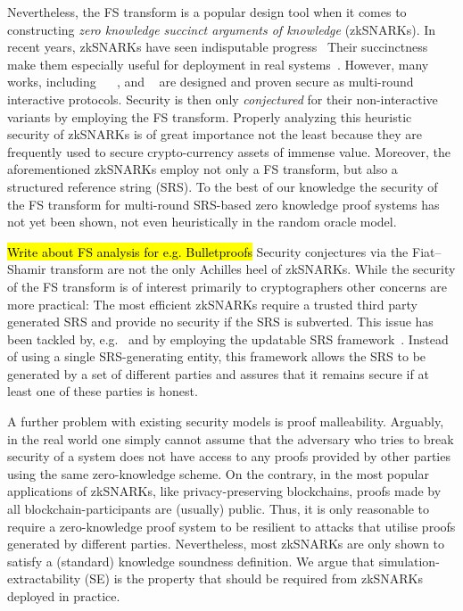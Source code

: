 \documentclass[runningheads,11pt]{llncs}
\begin{document}
Nevertheless, the FS transform is a popular design tool when it comes
to constructing \emph{zero knowledge succinct arguments of knowledge}
(zkSNARKs). In recent years, zkSNARKs have seen indisputable progress~\cite{AC:Groth10a,TCC:Lipmaa12,EC:GGPR13,SP:PHGR13,AC:Lipmaa13,AC:DFGK14,EC:Groth16,SP:BBBPWM18}
Their succinctness make them especially useful for deployment in
real systems~\cite{REPO:Zcash20,ARXIV:RonZaj19,REPO:Zeth20,REPO:Celo20,REPO:Aztec20}. However,
many works, including \sonic{}~\cite{CCS:MBKM19}
\plonk{}~\cite{EPRINT:GabWilCio19}, and \marlin~\cite{EC:CHMMVW20} are designed and proven secure as multi-round interactive protocols. Security is then only
\emph{conjectured} for their non-interactive variants by employing
the FS transform. Properly analyzing this heuristic security of zkSNARKs is of great importance not the least because they are frequently
used to secure crypto-currency assets of immense value. Moreover, the aforementioned
zkSNARKs employ not only a FS transform, but also a structured
reference string (SRS). To the best of our knowledge the security of the FS
transform for multi-round SRS-based zero knowledge proof systems has not yet been
shown, not even heuristically in the random oracle model. 

\hl{Write about FS analysis for e.g. Bulletproofs}
Security conjectures via the Fiat--Shamir transform are not the only Achilles heel of zkSNARKs. While the security of the FS transform is of interest primarily to cryptographers other concerns are more practical: The most efficient zkSNARKs
require a trusted third party generated SRS and provide no security if the
SRS is subverted. This issue has been tackled by, e.g.~\plonk{}
and \sonic{} by employing the updatable SRS framework~\cite{C:GKMMM18}. Instead of
using a single SRS-generating entity, this framework allows the SRS to be generated by a set of
different parties and assures that it remains secure if at least one of these
parties is honest.

A further problem with existing security models is proof malleability.  Arguably,
in the real world one simply cannot assume that the adversary who tries to break
security of a system does not have access to any proofs provided by other
parties using the same zero-knowledge scheme. On the contrary, in the most
popular applications of zkSNARKs, like privacy-preserving blockchains, proofs
made by all blockchain-participants are (usually) public. Thus, it is only
reasonable to require a zero-knowledge proof system to be resilient to attacks
that utilise proofs generated by different parties.  Nevertheless, most zkSNARKs
are only shown to satisfy a (standard) knowledge soundness definition. We
argue that simulation-extractability (SE) is the property that should be
required from zkSNARKs deployed in practice.
\end{document}
